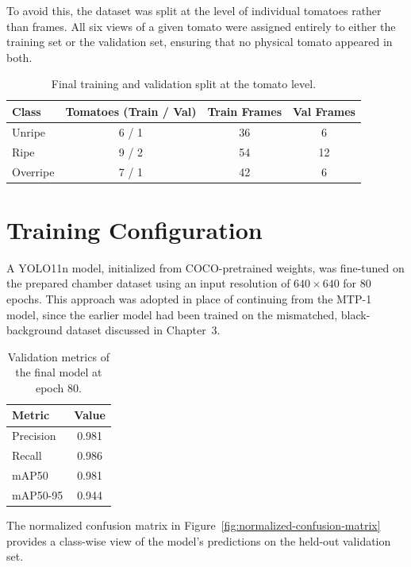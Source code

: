 \documentclass[12pt,a4paper]{report}
\begin{document}
To avoid this, the dataset was split at the level of individual tomatoes rather than frames. All six views of a given tomato were assigned entirely to either the training set or the validation set, ensuring that no physical tomato appeared in both.

\begin{table}[H]
    \centering
    \begin{tabular}{|l|c|c|c|}
        \hline
        \textbf{Class} & \textbf{Tomatoes (Train / Val)} & \textbf{Train Frames} & \textbf{Val Frames} \\
        \hline
        Unripe & 6 / 1 & 36 & 6 \\
        Ripe & 9 / 2 & 54 & 12 \\
        Overripe & 7 / 1 & 42 & 6 \\
        \hline
    \end{tabular}
    \caption{Final training and validation split at the tomato level.}
    \label{tab:final-dataset-split}
\end{table}

\section{Training Configuration}

A YOLO11n model, initialized from COCO-pretrained weights, was fine-tuned on the prepared chamber dataset using an input resolution of $640 \times 640$ for 80 epochs. This approach was adopted in place of continuing from the MTP-1 model, since the earlier model had been trained on the mismatched, black-background dataset discussed in Chapter~3.

\begin{table}[H]
    \centering
    \begin{tabular}{|l|c|}
        \hline
        \textbf{Metric} & \textbf{Value} \\
        \hline
        Precision & 0.981 \\
        Recall & 0.986 \\
        mAP50 & 0.981 \\
        mAP50-95 & 0.944 \\
        \hline
    \end{tabular}
    \caption{Validation metrics of the final model at epoch 80.}
    \label{tab:final-model-metrics}
\end{table}

The normalized confusion matrix in Figure~\ref{fig:normalized-confusion-matrix} provides a class-wise view of the model's predictions on the held-out validation set.
\end{document}
